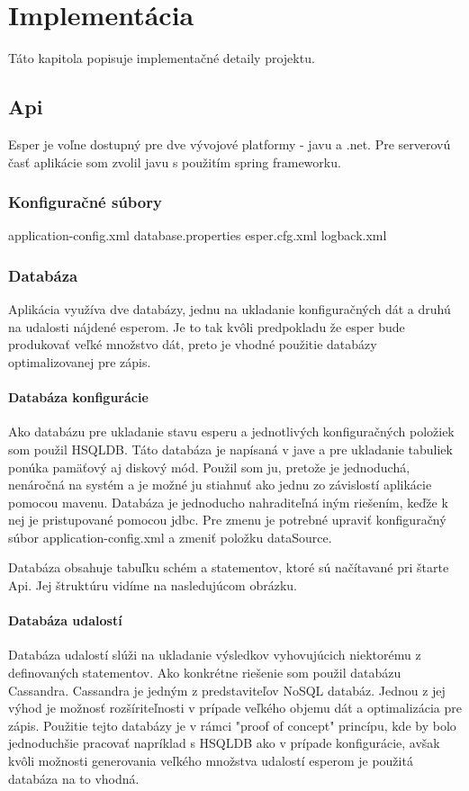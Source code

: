 \chapter{Implementácia}
Táto kapitola popisuje implementačné detaily projektu. 

\section{Api}
	Esper je voľne dostupný pre dve vývojové platformy - javu a .net. Pre serverovú časť aplikácie som zvolil javu s použitím spring frameworku.
	\subsection{Konfiguračné súbory}
		application-config.xml
		database.properties
		esper.cfg.xml
		logback.xml
	\subsection{Databáza}
		Aplikácia využíva dve databázy, jednu na ukladanie konfiguračných dát a druhú na udalosti nájdené esperom. Je to tak kvôli predpokladu že esper bude produkovať veľké množstvo dát, preto je vhodné použitie databázy optimalizovanej pre zápis.
	
		\subsubsection{Databáza konfigurácie}
		Ako databázu pre ukladanie stavu esperu a jednotlivých konfiguračných položiek som použil \ac{HSQLDB}. Táto databáza je napísaná v jave a pre ukladanie tabuliek ponúka pamäťový aj diskový mód. Použil som ju, pretože je jednoduchá, nenáročná na systém a je možné ju stiahnuť ako jednu zo závislostí aplikácie pomocou mavenu. Databáza je jednoducho nahraditeľná iným riešením, keďže k nej je pristupované pomocou jdbc. Pre zmenu je potrebné upraviť konfiguračný súbor application-config.xml a zmeniť položku dataSource.
		
		Databáza obsahuje tabuľku schém a statementov, ktoré sú načítavané pri štarte Api. Jej štruktúru vidíme na nasledujúcom obrázku.
			
		\subsubsection{Databáza udalostí}
		Databáza udalostí slúži na ukladanie výsledkov vyhovujúcich niektorému z definovaných statementov. Ako konkrétne riešenie som použil databázu Cassandra. Cassandra je jedným z predstaviteľov NoSQL databáz. Jednou z jej výhod je možnosť rozšíriteľnosti v prípade veľkého objemu dát a optimalizácia pre zápis. Použitie tejto databázy je v rámci "proof of concept" princípu, kde by bolo jednoduchšie pracovať napríklad s HSQLDB ako v prípade konfigurácie, avšak kvôli možnosti generovania veľkého množstva udalostí esperom je použitá databáza na to vhodná.
	
